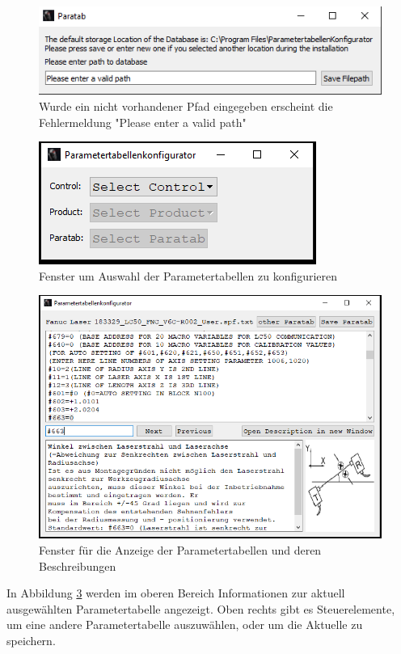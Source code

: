 \begin{figure}[H]
\includegraphics[scale=1]{pictures_and_research/Bilder/errorFilePathW.PNG}
\caption{Wurde ein nicht vorhandener Pfad eingegeben erscheint die Fehlermeldung "Please enter a valid path"}
\label{fig:filepError}
\end{figure}
\begin{figure}[H]
\includegraphics[scale=1]{pictures_and_research/Bilder/configW.PNG}
\caption{Fenster um Auswahl der Parametertabellen zu konfigurieren}
\label{fig:ConfigW}
\end{figure}
\begin{figure}[H]
\includegraphics[scale=0.75]{pictures_and_research/Bilder/paratabW.PNG}
\caption{Fenster für die Anzeige der Parametertabellen und deren Beschreibungen}
\label{fig:Paraw}
\end{figure}
\noindent
In Abbildung \ref{fig:Paraw} werden im oberen Bereich Informationen zur aktuell ausgewählten Parametertabelle angezeigt. Oben rechts gibt es Steuerelemente, um eine andere Parametertabelle auszuwählen, oder um die Aktuelle zu speichern.\\
